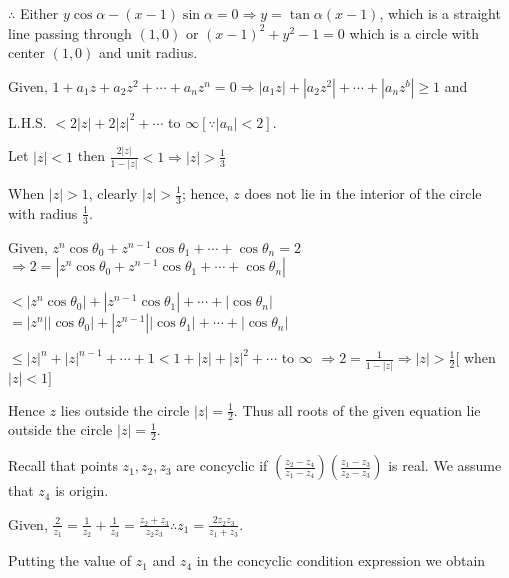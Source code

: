  $\therefore $ Either $y\cos\alpha - (x - 1)\sin\alpha = 0 \Rightarrow y = \tan\alpha(x - 1)$, which is a
  straight line passing through $(1, 0)$ or $(x - 1)^2 + y^2 - 1 = 0$ which is a circle with center $(1, 0)$
  and unit radius.
\item Given, $1 + a_1z + a_2z^2 + \cdots + a_nz^n = 0 \Rightarrow |a_1z| + |a_2z^2| + \cdots + |a_nz^b|\geq
  1$ and

  L.H.S. $ < 2|z| + 2|z|^2 + \cdots$ to $\infty[\because |a_n| < 2]$.

  Let $|z| < 1$ then $\frac{2|z|}{1 - |z|} < 1 \Rightarrow |z| > \frac{1}{3}$

  When $|z|> 1$, clearly $|z| > \frac{1}{3}$; hence, $z$ does not lie in the interior of the circle with
  radius $\frac{1}{3}$.
\item Given, $z^n\cos\theta_0 + z^{n - 1}\cos\theta_1 + \cdots + \cos\theta_n = 2$
  $\Rightarrow 2 = |z^n\cos\theta_0 + z^{n - 1}\cos\theta_1 + \cdots + \cos\theta_n|$

  $< |z^n\cos\theta_0| + |z^{n - 1}\cos\theta_1| + \cdots + |\cos\theta_n|$
  $= |z^n||\cos\theta_0| + |z^{n - 1}||\cos\theta_1| + \cdots + |\cos\theta_n|$

  $\leq |z|^n + |z|^{n - 1}  + \cdots + 1 < 1 + |z| + |z|^2 + \cdots$ to $\infty$
  $\Rightarrow 2 = \frac{1}{1 - |z|} \Rightarrow |z| > \frac{1}{2} [$ when $|z| < 1]$

  Hence $z$ lies outside the circle $|z| = \frac{1}{2}$.
  Thus all roots of the given equation lie outside the circle $|z| = \frac{1}{2}$.
\item Recall that points $z_1, z_2, z_3$ are concyclic if $\left(\frac{z_2 - z_4}{z_1 -
  z_4}\right)\left(\frac{z_1 - z_3}{z_2 - z_3}\right)$ is real. We assume that $z_4$ is origin.

  Given, $\frac{2}{z_1} = \frac{1}{z_2} + \frac{1}{z_3} = \frac{z_2 + z_3}{z_2z_3} \therefore z_1 =
  \frac{2z_2z_3}{z_1+z_3}$.

  Putting the value of $z_1$ and $z_4$ in the concyclic condition expression we obtain


